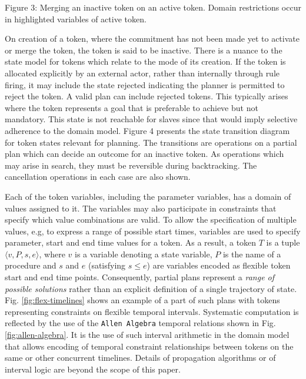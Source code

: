 Figure 3: Merging an inactive token on an active token. Domain
restrictions occur in highlighted variables of active token.

On creation of a token, where the commitment has not been made yet to
activate or merge the token, the token is said to be inactive. There
is a nuance to the state model for tokens which relate to the mode of
its creation. If the token is allocated explicitly by an external
actor, rather than internally through rule firing, it may include the
state rejected indicating the planner is permitted to reject the
token. A valid plan can include rejected tokens. This typically arises
where the token represents a goal that is preferable to achieve but
not mandatory. This state is not reachable for slaves since that would
imply selective adherence to the domain model. Figure 4 presents the
state transition diagram for token states relevant for planning. The
transitions are operations on a partial plan which can decide an
outcome for an inactive token. As operations which may arise in
search, they must be reversible during backtracking. The cancellation
operations in each case are also shown.



 
Each of the token variables, including the parameter variables, has a
domain of values assigned to it.  The variables may also participate
in constraints that specify which value combinations are valid.  To
allow the specification of multiple values, e.g, to express a range of
possible start times, variables are used to specify parameter, start
and end time values for a token.  As a result, a token $T$ is a tuple
$\langle v, P, s, e \rangle$, where $v$ is a variable denoting a state
variable, $P$ is the name of a procedure and $s$ and $e$ (satisfying
$s\leq e$) are variables encoded as flexible token start and end time
points. Consequently, partial plans represent a \textit{range of
  possible solutions} rather than an explicit definition of a single
trajectory of state.  Fig. \ref{fig:flex-timelines} shows an example
of a part of such plans with tokens representing constraints on
flexible temporal intervals. Systematic computation is reflected by
the use of the \texttt{Allen Algebra} \cite{allen84} temporal
relations shown in Fig. \ref{fig:allen-algebra}. It is the use of such
interval arithmetic in the \eu domain model that allows
encoding of temporal constraint relationships between tokens on the
same or other concurrent timelines. Details of propagation algorithms
or of interval logic are beyond the scope of this paper.

